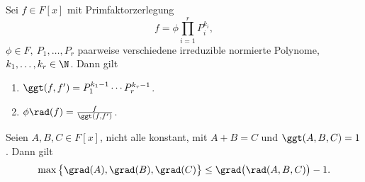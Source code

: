 \begin{lem}\autolabel
	Sei $f \in F[x]$ mit Primfaktorzerlegung
	\[ f = \phi \prod_{i=1}^r P_i^{k_i}, \]
	$\phi \in F,\ P_1,\dotsc,P_r$ paarweise verschiedene irreduzible normierte Polynome, $k_1,\dotsc,k_r \in \N$. Dann gilt
	\begin{enumerate}[label={\roman*})]
		\item $\ggt(f,f') = P_1^{k_1-1} \dotsm P_r^{k_r-1}$.\\
		\item $\phi \rad(f) = \frac{f}{\ggt(f,f')}$.
	\end{enumerate}
\end{lem}

\begin{thm*}
	Seien $A,B,C \in F[x]$, nicht alle konstant, mit $A+B=C$ und $\ggt(A,B,C) = 1$. Dann gilt
	\[ \max\big\{ \grad(A),\grad(B),\grad(C) \big\} \leq \grad\big(\rad(A,B,C)\big)-1. \]
\end{thm*}